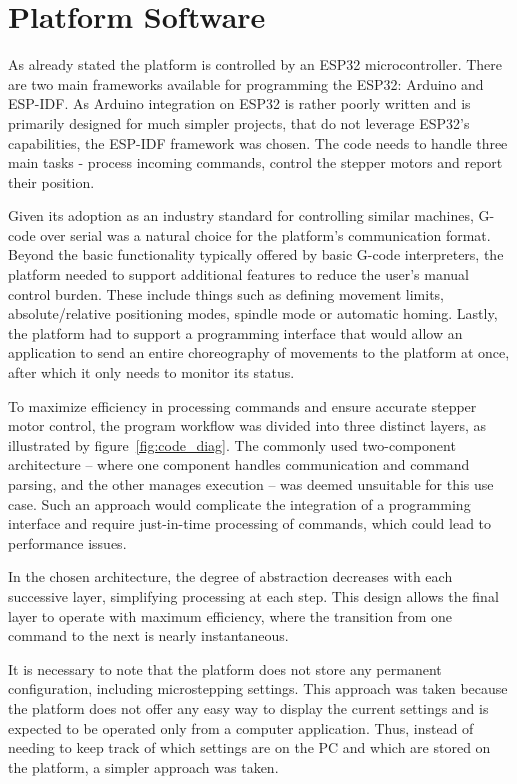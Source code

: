 \section{Platform Software}

As already stated the platform is controlled by an ESP32 microcontroller.
There are two main frameworks available for programming the ESP32: Arduino and ESP-IDF.
As Arduino integration on ESP32 is rather poorly written and is primarily designed for much simpler projects, that do not leverage ESP32's capabilities, the ESP-IDF framework was chosen.
The code needs to handle three main tasks - process incoming commands, control the stepper motors and report their position.

Given its adoption as an industry standard for controlling similar machines, G-code over serial was a natural choice for the platform's communication format.
Beyond the basic functionality typically offered by basic G-code interpreters, the platform needed to support additional features to reduce the user's manual control burden.
These include things such as defining movement limits, absolute/relative positioning modes, spindle mode or automatic homing.
Lastly, the platform had to support a programming interface that would allow an application to send an entire choreography of movements to the platform at once, after which it only needs to monitor its status.

To maximize efficiency in processing commands and ensure accurate stepper motor control, the program workflow was divided into three distinct layers, as illustrated by figure~\ref{fig:code_diag}.
The commonly used two-component architecture -- where one component handles communication and command parsing, and the other manages execution -- was deemed unsuitable for this use case.
Such an approach would complicate the integration of a programming interface and require just-in-time processing of commands, which could lead to performance issues.

In the chosen architecture, the degree of abstraction decreases with each successive layer, simplifying processing at each step.
This design allows the final layer to operate with maximum efficiency, where the transition from one command to the next is nearly instantaneous.

It is necessary to note that the platform does not store any permanent configuration, including microstepping settings.
This approach was taken because the platform does not offer any easy way to display the current settings and is expected to be operated only from a computer application.
Thus, instead of needing to keep track of which settings are on the PC and which are stored on the platform, a simpler approach was taken.

